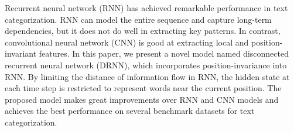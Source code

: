 Recurrent neural network (RNN) has achieved remarkable performance in text categorization. RNN can model the entire sequence and capture long-term dependencies, but it does not do well in extracting key patterns. In contrast, convolutional neural network (CNN) is good at extracting local and position-invariant features. In this paper, we present a novel model named disconnected recurrent neural network (DRNN), which incorporates position-invariance into RNN. By limiting the distance of information flow in RNN, the hidden state at each time step is restricted to represent words near the current position. The proposed model makes great improvements over RNN and CNN models and achieves the best performance on several benchmark datasets for text categorization.
